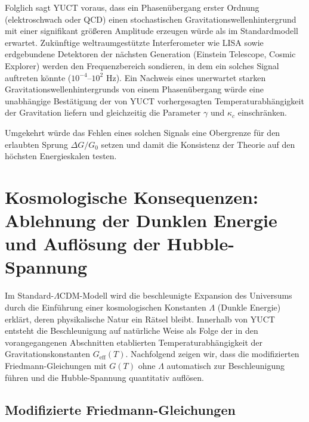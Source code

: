 \documentclass[12pt]{article}
\theoremstyle{remark}
\begin{document}
	Folglich sagt YUCT voraus, dass ein Phasenübergang erster Ordnung (elektroschwach oder QCD)
	einen stochastischen Gravitationswellenhintergrund mit einer signifikant größeren Amplitude erzeugen würde als im Standardmodell erwartet.
	Zukünftige weltraumgestützte Interferometer wie LISA sowie
	erdgebundene Detektoren der nächsten Generation (Einstein Telescope, Cosmic Explorer) werden den Frequenzbereich sondieren, in dem ein solches Signal auftreten könnte ($10^{-4}$–$10^{2}$ Hz).
	Ein Nachweis eines unerwartet starken Gravitationswellenhintergrunds von einem Phasenübergang würde eine unabhängige Bestätigung der von YUCT vorhergesagten Temperaturabhängigkeit der Gravitation liefern und gleichzeitig die Parameter $\gamma$ und $\kappa_c$ einschränken.
	
	Umgekehrt würde das Fehlen eines solchen Signals eine Obergrenze für den erlaubten Sprung $\Delta G/G_0$ setzen und damit die Konsistenz der Theorie auf den höchsten Energieskalen testen.
	
	\section{Kosmologische Konsequenzen: Ablehnung der Dunklen Energie und Auflösung der Hubble-Spannung}
	\label{sec:cosmo-consequences}
	
	Im Standard-$\Lambda$CDM-Modell wird die beschleunigte Expansion des Universums durch die Einführung einer kosmologischen Konstanten $\Lambda$ (Dunkle Energie) erklärt, deren physikalische Natur ein Rätsel bleibt. Innerhalb von YUCT entsteht die Beschleunigung auf natürliche Weise als Folge der in den vorangegangenen Abschnitten etablierten Temperaturabhängigkeit der Gravitationskonstanten $G_{\mathrm{eff}}(T)$. Nachfolgend zeigen wir, dass die modifizierten Friedmann-Gleichungen mit $G(T)$ ohne $\Lambda$ automatisch zur Beschleunigung führen und die Hubble-Spannung quantitativ auflösen.
	
	\subsection{Modifizierte Friedmann-Gleichungen}
	
\end{document}
